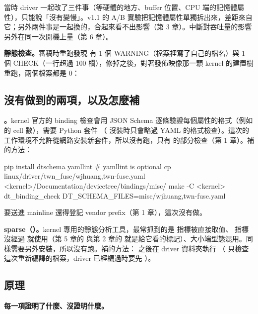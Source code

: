 當時 driver 一起改了三件事（等硬體的地方、buffer 位置、CPU 端的記憶體屬性），只能說「沒有變慢」。v1.1 的 A/B 實驗把記憶體屬性單獨拆出來，差距來自它；另外兩件事是一起換的，合起來看不出影響（第 3 章）。中斷對吞吐量的影響另外在同一次開機上量（第 6 章）。

\textbf{靜態檢查。}審稿時重跑發現  有 1 個 WARNING（檔案裡寫了自己的檔名）與 1 個 CHECK（一行超過 100 欄），修掉之後，對著發佈映像那一顆 kernel 的建置樹重跑，兩個檔案都是 0：


\subsection{沒有做到的兩項，以及怎麼補}

\textbf{。}kernel 官方的 binding 檢查會用 JSON Schema 逐條驗證每個屬性的格式（例如  的 cell 數），需要 Python 套件 （ 沒裝時只會略過 YAML 的格式檢查）。這次的工作環境不允許從網路安裝新套件，所以沒有跑，只有  的部分檢查（第 1 章）。補的方法：

\begin{cmdline}
pip install dtschema yamllint     # yamllint is optional
cp linux/driver/twn_fuse/wjhuang,twn-fuse.yaml <kernel>/Documentation/devicetree/bindings/misc/
make -C <kernel> dt_binding_check DT_SCHEMA_FILES=misc/wjhuang,twn-fuse.yaml
\end{cmdline}

要送進 mainline 還得登記 vendor prefix（第 1 章），這次沒有做。

\textbf{sparse（）。}kernel 專用的靜態分析工具，最常抓到的是  指標被直接取值、 指標沒經過  就使用（第 5 章的  與第 2 章的  就是給它看的標記）、大小端型態混用。同樣需要另外安裝，所以沒有跑。補的方法： 之後在 driver 資料夾執行 （ 只檢查這次重新編譯的檔案，driver 已經編過時要先 ）。

\subsection{原理}

\textbf{每一項證明了什麼、沒證明什麼。}

